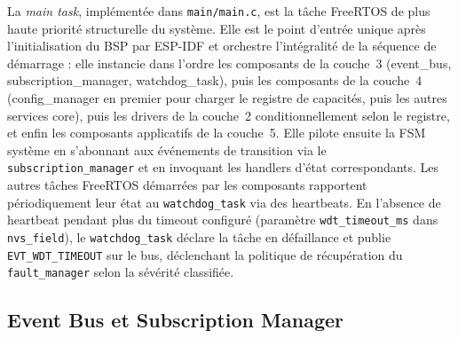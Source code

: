 La \textit{main task}, implémentée dans \texttt{main/main.c}, est la
tâche FreeRTOS de plus haute priorité structurelle du système. Elle
est le point d'entrée unique après l'initialisation du BSP par
ESP-IDF et orchestre l'intégralité de la séquence de démarrage : elle
instancie dans l'ordre les composants de la couche~3 (event\_bus,
subscription\_manager, watchdog\_task), puis les composants de la
couche~4 (config\_manager en premier pour charger le registre de
capacités, puis les autres services core), puis les drivers de la
couche~2 conditionnellement selon le registre, et enfin les composants
applicatifs de la couche~5. Elle pilote ensuite la FSM système en
s'abonnant aux événements de transition via le \texttt{subscription\_manager}
et en invoquant les handlers d'état correspondants. Les autres tâches
FreeRTOS démarrées par les composants rapportent périodiquement leur
état au \texttt{watchdog\_task} via des heartbeats. En l'absence de
heartbeat pendant plus du timeout configuré (paramètre \texttt{wdt\_timeout\_ms}
dans \texttt{nvs\_field}), le \texttt{watchdog\_task} déclare la tâche
en défaillance et publie \texttt{EVT\_WDT\_TIMEOUT} sur le bus,
déclenchant la politique de récupération du \texttt{fault\_manager}
selon la sévérité classifiée.

\subsection{Event Bus et Subscription Manager}
\label{subsec:event_bus}

